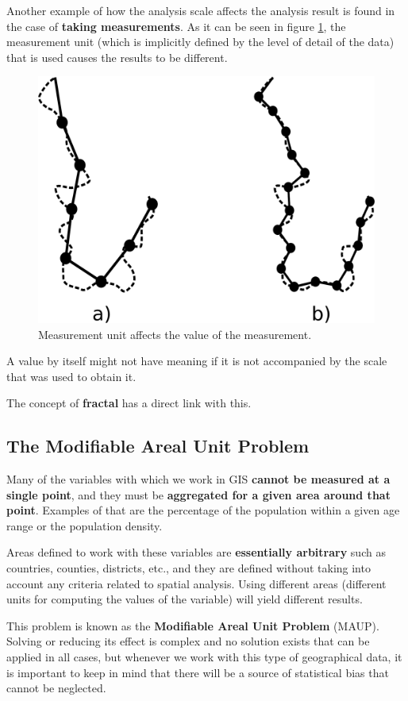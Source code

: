 Another example of how the analysis scale affects the analysis result is found in the case of \textbf{taking measurements}. As it can be seen in figure \ref{Fig:Fractal_line}, the measurement unit (which is implicitly defined by the level of detail of the data) that is used causes the results to be different. 

\begin{figure}[h]   
\centering
\includegraphics[width= .45\columnwidth]{Analysis/Fractal_line.pdf}
\caption{\small Measurement unit affects the value of the measurement.}
\label{Fig:Fractal_line} 
\end{figure}

A value by itself might not have meaning if it is not accompanied by the scale that was used to obtain it.

The concept of \textbf{fractal} has a direct link with this.


\subsection{The Modifiable Areal Unit Problem}


Many of the variables with which we work in GIS \textbf{cannot be measured at a single point}, and they must be \textbf{aggregated for a given area around that point}. Examples of that are the percentage of the population within a given age range or the population density. 

Areas defined to work with these variables are \textbf{essentially arbitrary} such as countries, counties, districts, etc., and they are defined without taking into account any criteria related to spatial analysis. Using different areas (different units for computing the values of the variable) will yield different results.

This problem is known as the \textbf{Modifiable Areal Unit Problem} (MAUP). Solving or reducing its effect is complex and no solution exists that can be applied in all cases, but whenever we work with this type of geographical data, it is important to keep in mind that there will be a source of statistical bias that cannot be neglected.

